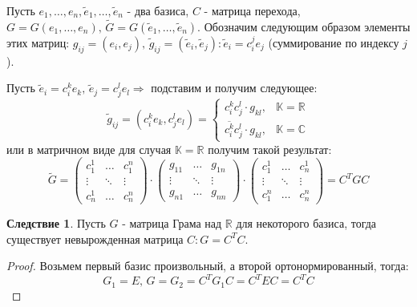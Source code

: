 \documentclass[12pt]{article}
\newcommand{\MR}{\mathbb{R}}
\newcommand{\MC}{\mathbb{C}}
\newcommand{\MK}{\mathbb{K}}
\theoremstyle{definition}
\newtheorem{corollary}{Следствие}
\begin{document}
Пусть $e_1, \dotsc, e_n, \tilde{e}_1, \dotsc, \tilde{e}_n$ - два базиса, $C$ - матрица перехода, $G = G(e_1,\dotsc, e_n), \, \widetilde{G} = G(\tilde{e}_1, \dotsc, \tilde{e}_n)$. Обозначим следующим образом элементы этих матриц: $g_{ij} = (e_i,e_j), \, \tilde{g}_{ij} = (\tilde{e}_i, \tilde{e}_j) \colon \tilde{e}_i = c_i^j e_j$ (суммирование по индексу $j$). 

Пусть $\tilde{e}_i = c_i^k e_k, \, \tilde{e}_j = c_j^l e_l \Rightarrow$ подставим и получим следующее:
$$
	\tilde{g}_{ij} = (c_i^k e_k, c_j^l e_l) = 
	\begin{cases}
		c_i^k c_j^l{\cdot} g_{kl}, & \MK = \MR \\[5pt]
		\overline{c_i^k}c_j^l{\cdot} g_{kl}, & \MK = \MC
	\end{cases}
$$
или в матричном виде для случая $\MK = \MR$ получим такой результат:
$$
	\widetilde{G} =
	\begin{pmatrix}
		c_1^1 & \dotsc & c_1^n \\
		\vdots & \ddots & \vdots \\
		c_n^1 & \dotsc & c_n^n 
	\end{pmatrix}{\cdot}
	\begin{pmatrix}
		g_{11} & \dotsc & g_{1n} \\
		\vdots & \ddots & \vdots \\
		g_{n1} & \dotsc & g_{nn} 
	\end{pmatrix}{\cdot}
	\begin{pmatrix}
		c_1^1 & \dotsc & c_n^1 \\
		\vdots & \ddots & \vdots \\
		c_1^n & \dotsc & c_n^n 
	\end{pmatrix} = C^T G C
$$
\begin{corollary}
	Пусть $G$ - матрица Грама над $\MR$ для некоторого базиса, тогда существует невырожденная матрица $C \colon G = C^T C$.
\end{corollary}
\begin{proof}
	Возьмем первый базис произвольный, а второй ортонормированный, тогда:
	$$
		G_1 = E, \, G = G_2 = C^T G_1 C = C^T E C = C^T C
	$$
\end{proof}
\newpage
\end{document}
